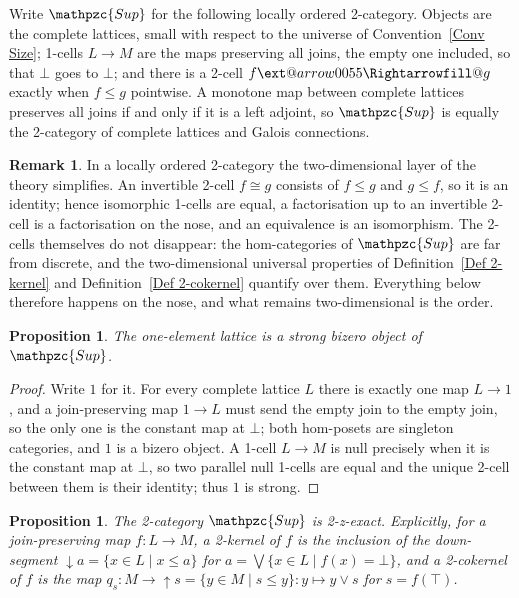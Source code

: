 \documentclass[reqno,a4paper]{amsart}
\makeatletter
\numberwithin{equation}{section}
\theoremstyle{plain}
\newtheorem{proposition}[subsection]{Proposition}
\theoremstyle{definition}
\newtheorem{remark}[subsection]{Remark}
\def\nameit#1{\textrm{#1}~}
\def\defx{\nameit{Definition}}
\newcommand{\iso}{\cong}
\newcommand{\catfont}[1]{\ensuremath{\mathpzc{#1}}\xspace}
\newcommand{\Sup}{\catfont{Sup}}
\renewcommand{\1}{\onecat{1}}
\newcommand{\dseg}[1]{\ensuremath{{\downarrow}#1}}
\newcommand{\useg}[1]{\ensuremath{{\uparrow}#1}}
\newcommand{\aR}[2][]{%
	\ext@arrow 0055{\Rightarrowfill@}{#1}{#2}}
\makeatother
\begin{document}
Write \(\Sup\) for the following locally ordered 2-category. Objects are the complete lattices, small with respect to the universe of Convention~\ref{Conv Size}; 1-cells \(L\to M\) are the maps preserving all joins, the empty one included, so that \(\bot\) goes to \(\bot\); and there is a 2-cell \(f\aR{}g\) exactly when \(f\leq g\) pointwise. A monotone map between complete lattices preserves all joins if and only if it is a left adjoint, so \(\Sup\) is equally the 2-category of complete lattices and Galois connections.

\begin{remark}\label{Rem Locally Ordered}
	In a locally ordered 2-category the two-dimensional layer of the theory simplifies. An invertible 2-cell \(f\iso g\) consists of \(f\leq g\) and \(g\leq f\), so it is an identity; hence isomorphic 1-cells are equal, a factorisation up to an invertible 2-cell is a factorisation on the nose, and an equivalence is an isomorphism. The 2-cells themselves do not disappear: the hom-categories of \(\Sup\) are far from discrete, and the two-dimensional universal properties of \defx\ref{Def 2-kernel} and \defx\ref{Def 2-cokernel} quantify over them. Everything below therefore happens on the nose, and what remains two-dimensional is the order.
\end{remark}

\begin{proposition}\label{P:SupBizero}
	The one-element lattice is a strong bizero object of \(\Sup\).
\end{proposition}

\begin{proof}
	Write \(1\) for it. For every complete lattice \(L\) there is exactly one map \(L\to 1\), and a join-preserving map \(1\to L\) must send the empty join to the empty join, so the only one is the constant map at \(\bot\); both hom-posets are singleton categories, and \(1\) is a bizero object. A 1-cell \(L\to M\) is null precisely when it is the constant map at \(\bot\), so two parallel null 1-cells are equal and the unique 2-cell between them is their identity; thus \(1\) is strong.
\end{proof}

\begin{proposition}\label{P:SupKernels}
	The 2-category \(\Sup\) is 2-z-exact. Explicitly, for a join-preserving map \(f\colon L\to M\), a 2-kernel of \(f\) is the inclusion of the down-segment \(\dseg{a}=\{x\in L\mid x\leq a\}\) for \(a=\bigvee\{x\in L\mid f(x)=\bot\}\), and a 2-cokernel of \(f\) is the map \(q_{s}\colon M\to\useg{s}=\{y\in M\mid s\leq y\}\colon y\mapsto y\vee s\) for \(s=f(\top)\).
\end{proposition}
\end{document}
